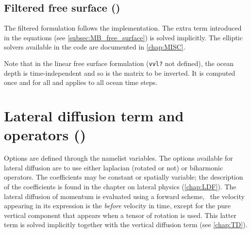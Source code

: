 \documentclass[../main/NEMO_manual]{subfiles}
\begin{document}
\subsection{Filtered free surface ()}
\label{subsec:DYN_spg_fltp}

The filtered formulation follows the \citet{roullet.madec_JGR00} implementation.
The extra term introduced in the equations (see \autoref{subsec:MB_free_surface}) is solved implicitly.
The elliptic solvers available in the code are documented in \autoref{chap:MISC}.


Note that in the linear free surface formulation (\texttt{vvl?} not defined),
the ocean depth is time-independent and so is the matrix to be inverted.
It is computed once and for all and applies to all ocean time steps.

\section[Lateral diffusion term and operators (\textit{dynldf.F90})]{Lateral diffusion term and operators (\protect{})}
\label{sec:DYN_ldf}

\begin{listing}
  \caption{}
  \label{lst:namdyn_ldf}
\end{listing}

Options are defined through the  namelist variables.
The options available for lateral diffusion are to use either laplacian (rotated or not) or biharmonic operators.
The coefficients may be constant or spatially variable;
the description of the coefficients is found in the chapter on lateral physics (\autoref{chap:LDF}).
The lateral diffusion of momentum is evaluated using a forward scheme,
\ie\ the velocity appearing in its expression is the \textit{before} velocity in time,
except for the pure vertical component that appears when a tensor of rotation is used.
This latter term is solved implicitly together with the vertical diffusion term (see \autoref{chap:TD}).
\end{document}
